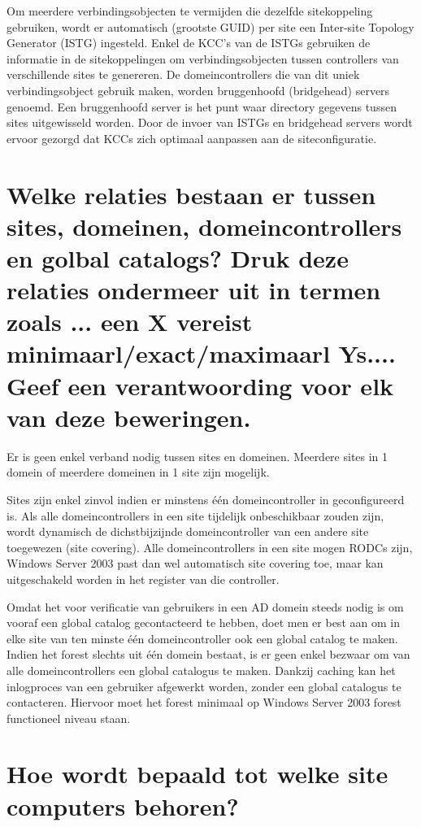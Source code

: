 Om meerdere verbindingsobjecten te vermijden die dezelfde sitekoppeling
gebruiken, wordt er automatisch (grootste GUID) per site een Inter-site Topology
Generator (ISTG) ingesteld. Enkel de KCC's van de ISTGs gebruiken de informatie
in de sitekoppelingen om verbindingsobjecten tussen controllers van
verschillende sites te genereren. De domeincontrollers die van dit uniek
verbindingsobject gebruik maken, worden bruggenhoofd (bridgehead) servers
genoemd. Een bruggenhoofd server is het punt waar directory gegevens tussen
sites uitgewisseld worden. Door de invoer van ISTGs en bridgehead servers wordt
ervoor gezorgd dat KCCs zich optimaal aanpassen aan de siteconfiguratie.

\section{Welke relaties bestaan er tussen sites, domeinen, domeincontrollers en
golbal catalogs? Druk deze relaties ondermeer uit in termen zoals ... een X
vereist minimaarl/exact/maximaarl Ys.... Geef een verantwoording voor elk van
deze beweringen.}

Er is geen enkel verband nodig tussen sites en domeinen. Meerdere sites in 1
domein of meerdere domeinen in 1 site zijn mogelijk.

Sites zijn enkel zinvol indien er minstens één domeincontroller in
geconfigureerd is. Als alle domeincontrollers in een site tijdelijk
onbeschikbaar zouden zijn, wordt dynamisch de dichstbijzijnde domeincontroller
van een andere site toegewezen (site covering). Alle domeincontrollers in een
site mogen RODCs zijn, Windows Server 2003 past dan wel automatisch site
covering toe, maar kan uitgeschakeld worden in het register van die controller.

Omdat het voor verificatie van gebruikers in een AD domein steeds nodig is om
vooraf een global catalog gecontacteerd te hebben, doet men er best aan om in
elke site van ten minste één domeincontroller ook een global catalog te maken.
Indien het forest slechts uit één domein bestaat, is er geen enkel bezwaar om
van alle domeincontrollers een global catalogus te maken. Dankzij caching kan
het inlogproces van een gebruiker afgewerkt worden, zonder een global catalogus
te contacteren. Hiervoor moet het forest minimaal op Windows Server 2003 forest
functioneel niveau staan.

\section{Hoe wordt bepaald tot welke site computers behoren?}

